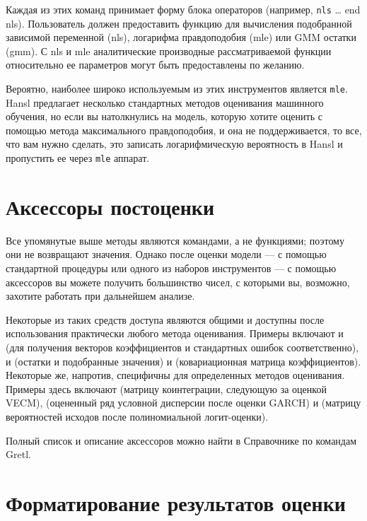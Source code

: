 Каждая из этих команд принимает форму блока операторов (например,
\texttt{nls} \dots{} \textrm{end nls}). Пользователь должен
предоставить функцию для вычисления подобранной зависимой переменной
(nls), логарифма правдоподобия (mle) или GMM остатки (gmm). С nls и
mle аналитические производные рассматриваемой функции относительно ее
параметров могут быть предоставлены по желанию.

Вероятно, наиболее широко используемым из этих инструментов является
\texttt{mle}. Hansl предлагает несколько стандартных методов
оценивания машинного обучения, но если вы натолкнулись на модель,
которую хотите оценить с помощью метода максимального правдоподобия, и
она не поддерживается, то все, что вам нужно сделать, это записать
логарифмическую вероятность в Hansl и пропустить ее через \texttt{mle}
аппарат.

\section{Аксессоры постоценки}
\label{sec:postest-accessors}

Все упомянутые выше методы являются командами, а не функциями; поэтому
они не возвращают значения. Однако после оценки модели --- с помощью
стандартной процедуры или одного из наборов инструментов --- с помощью
аксессоров вы можете получить большинство чисел, с которыми вы,
возможно, захотите работать при дальнейшем анализе.

Некоторые из таких средств доступа являются общими и доступны после
использования практически любого метода оценивания. Примеры включают
 и  (для получения векторов коэффициентов
и стандартных ошибок соответственно),  и 
(остатки и подобранные значения) и  (ковариационная
матрица коэффициентов). Некоторые же, напротив, специфичны для
определенных методов оценивания. Примеры здесь включают 
(матрицу коинтеграции, следующую за оценкой VECM), 
(оцененный ряд условной дисперсии после оценки GARCH) и
 (матрицу вероятностей исходов после полиномиальной
логит-оценки).

Полный список и описание аксессоров можно найти в Справочнике по
командам Gretl.

\section{Форматирование результатов оценки}
\label{sec:model-format}

